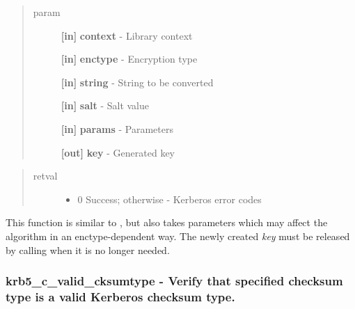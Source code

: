 \documentclass[letterpaper,10pt,english]{sphinxmanual}
\begin{document}
\begin{quote}\begin{description}
\item[{param}] \leavevmode
\textbf{{[}in{]}} \textbf{context} - Library context

\textbf{{[}in{]}} \textbf{enctype} - Encryption type

\textbf{{[}in{]}} \textbf{string} - String to be converted

\textbf{{[}in{]}} \textbf{salt} - Salt value

\textbf{{[}in{]}} \textbf{params} - Parameters

\textbf{{[}out{]}} \textbf{key} - Generated key

\end{description}\end{quote}
\begin{quote}\begin{description}
\item[{retval}] \leavevmode\begin{itemize}
\item {} 
0   Success; otherwise - Kerberos error codes

\end{itemize}

\end{description}\end{quote}

This function is similar to {\hyperref[appdev/refs/api/krb5_c_string_to_key:krb5_c_string_to_key]{}} , but also takes parameters which may affect the algorithm in an enctype-dependent way. The newly created \emph{key} must be released by calling {\hyperref[appdev/refs/api/krb5_free_keyblock_contents:krb5_free_keyblock_contents]{}} when it is no longer needed.


\subsubsection{krb5\_c\_valid\_cksumtype -  Verify that specified checksum type is a valid Kerberos checksum type.}
\label{appdev/refs/api/krb5_c_valid_cksumtype:krb5-c-valid-cksumtype-verify-that-specified-checksum-type-is-a-valid-kerberos-checksum-type}\label{appdev/refs/api/krb5_c_valid_cksumtype::doc}

\begin{fulllineitems}
\label{appdev/refs/api/krb5_c_valid_cksumtype:krb5_c_valid_cksumtype}
\end{fulllineitems}
\end{document}
